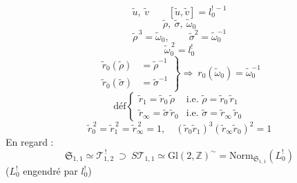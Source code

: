 \documentclass[11pt,a4paper]{article}
\begin{document}
\[
  \tilde u,\ \tilde v \qquad [\tilde u,\tilde v] = l^{!\,-1}_0
\]
\[
  \tilde\rho,\ \tilde\sigma,\ \tilde\omega_0
\]
\[
  \tilde\rho^{\,3} = \tilde\omega_0,\qquad \tilde\sigma^{2} = \tilde\omega_0^{-1}
\]
\[
  \tilde\omega_0^{\,2} = l^!_0
\]
\[
  \left.
  \begin{aligned}
    \tilde r_0(\tilde\rho) &= \tilde\rho^{-1}\\
    \tilde r_0(\tilde\sigma) &= \tilde\sigma^{-1}
  \end{aligned}
  \right\}
  \Longrightarrow\ r_0(\tilde\omega_0) = \tilde\omega_0^{-1}
\]
\[
  \text{déf}
  \begin{cases}
    \tilde r_1 = \tilde r_0\,\tilde\rho & \text{i.e. } \tilde\rho = \tilde r_0\,\tilde r_1\\
    \tilde r_\infty = \tilde\sigma\,\tilde r_0 & \text{i.e. } \tilde\sigma = \tilde r_\infty\,\tilde r_0
  \end{cases}
\]
\[
  \boxed{\ \tilde r_0^{\,2} = \tilde r_1^{\,2} = \tilde r_\infty^{\,2} = 1,\quad
  (\tilde r_0\tilde r_1)^3(\tilde r_\infty\tilde r_0)^2 = 1\ }
\]
En regard :
\[
  \mathfrak{S}_{1,1} \simeq \mathcal{T}_{1,2}^{\,!}
  \ \supset\ S\mathcal{T}_{1,1} \simeq \mathrm{Gl}(2,\mathbb{Z})^{\sim}
  = \mathrm{Norm}_{\mathfrak{S}_{1,1}}(L^!_0)
\]
($L^!_0$ engendré par $l^!_0$)
\end{document}
